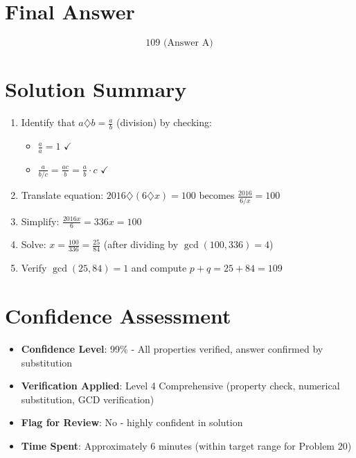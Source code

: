 \documentclass[11pt]{article}
\begin{document}
\section*{Final Answer}
\[
\boxed{109 \text{ (Answer A)}}
\]

\section*{Solution Summary}
\begin{enumerate}
    \item Identify that $a \diamondsuit b = \frac{a}{b}$ (division) by checking:
    \begin{itemize}
        \item $\frac{a}{a} = 1$ $\checkmark$
        \item $\frac{a}{b/c} = \frac{ac}{b} = \frac{a}{b} \cdot c$ $\checkmark$
    \end{itemize}
    
    \item Translate equation: $2016 \diamondsuit (6 \diamondsuit x) = 100$ becomes $\frac{2016}{6/x} = 100$
    
    \item Simplify: $\frac{2016x}{6} = 336x = 100$
    
    \item Solve: $x = \frac{100}{336} = \frac{25}{84}$ (after dividing by $\gcd(100, 336) = 4$)
    
    \item Verify $\gcd(25, 84) = 1$ and compute $p + q = 25 + 84 = 109$
\end{enumerate}

\section*{Confidence Assessment}
\begin{itemize}[leftmargin=*]
    \item \textbf{Confidence Level}: 99\% - All properties verified, answer confirmed by substitution
    \item \textbf{Verification Applied}: Level 4 Comprehensive (property check, numerical substitution, GCD verification)
    \item \textbf{Flag for Review}: No - highly confident in solution
    \item \textbf{Time Spent}: Approximately 6 minutes (within target range for Problem 20)
\end{itemize}
\end{document}
